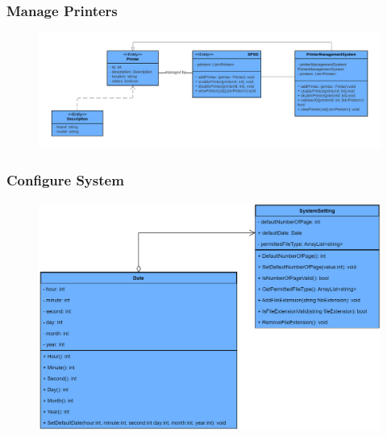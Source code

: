     \newpage
    \subsubsection{Manage Printers}
    \begin{center}
    \begin{figure}[!htp]
    \begin{center}
     \includegraphics[scale=.5]{images/Task2/ClassDiagrams/ManagingPrinters.pdf}
    \end{center}
    \label{refhinh1}
    \end{figure}
    \end{center}


    \subsubsection{Configure System}
    \begin{center}
    \begin{figure}[!htp]
    \begin{center}
     \includegraphics[scale=.2]{images/Task2/ClassDiagrams/ConfigureSystemClassDiagram.png}
    \end{center}
    \label{refhinh1}
    \end{figure}
    \end{center}


